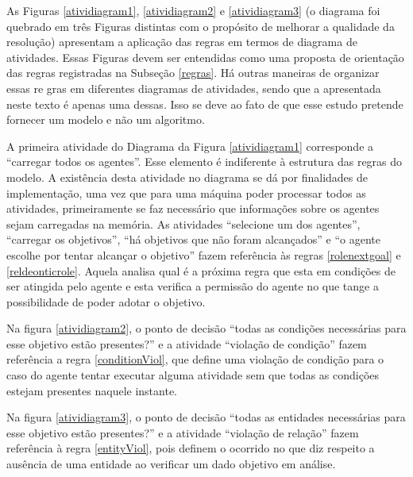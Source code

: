 As Figuras \ref{atividiagram1}, \ref{atividiagram2} e \ref{atividiagram3} (o diagrama foi quebrado em três Figuras distintas com o propósito de melhorar a qualidade da resolução)  apresentam a aplicação das regras em termos de diagrama de atividades. Essas Figuras devem ser entendidas como uma proposta de orientação das regras registradas na Subseção \ref{regras}. Há outras maneiras de organizar essas re  gras em diferentes diagramas de atividades, sendo que a apresentada neste texto é apenas uma dessas. Isso se deve ao fato de que esse estudo pretende fornecer um modelo e não um algoritmo. 

A primeira atividade do Diagrama da Figura \ref{atividiagram1} corresponde a ``carregar todos os agentes''. Esse elemento é indiferente à estrutura das regras do modelo. A existência desta atividade no diagrama se dá por finalidades de implementação, uma vez que para uma máquina poder processar todos as atividades, primeiramente se faz necessário que informações sobre os agentes sejam carregadas na memória. As atividades ``selecione um dos agentes'', ``carregar os objetivos'', ``há objetivos que não foram alcançados'' e ``o agente escolhe por tentar alcançar o objetivo'' fazem referência às regras \ref{rolenextgoal} e \ref{reldeonticrole}. Aquela analisa qual é a próxima regra que esta em condições de ser atingida pelo agente e esta verifica a permissão do agente no que tange a possibilidade de poder adotar o objetivo. 

Na figura \ref{atividiagram2}, o ponto de decisão ``todas as condições necessárias para esse objetivo estão presentes?'' e a atividade ``violação de condição'' fazem referência a regra \ref{conditionViol}, que define uma violação de condição para o caso do agente tentar executar alguma atividade sem que todas as condições estejam presentes naquele instante.

Na figura \ref{atividiagram3}, o ponto de decisão ``todas as entidades necessárias para esse objetivo estão presentes?'' e a atividade ``violação de relação'' fazem referência à regra \ref{entityViol}, pois definem o ocorrido no que diz respeito a ausência de uma entidade ao verificar um dado objetivo em análise. 

